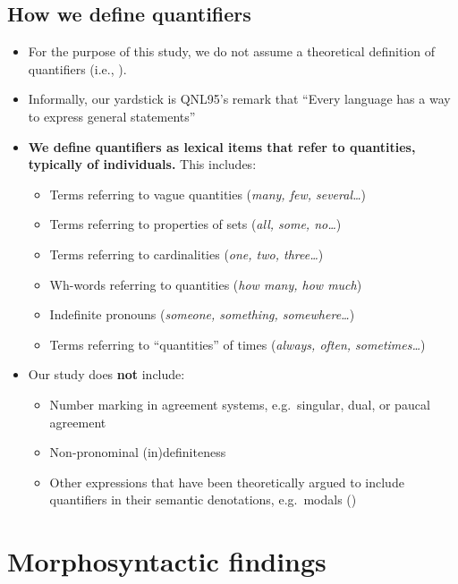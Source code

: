 \documentclass{article}
\begin{document}
\subsection{How we define quantifiers}
\begin{itemize}
\item For the purpose of this study, we do not assume a theoretical definition of quantifiers (i.e., \citealt{heimkratzer98}).
\item Informally, our yardstick is QNL95's remark that ``Every language has a way to express general statements'' %
\item \textbf{We define quantifiers as lexical items that refer to quantities, typically of individuals.}  This includes:
  
  
  \begin{itemize}
  \item Terms referring to vague quantities (\textit{many, few, several\ldots})
  \item Terms referring to properties of sets (\textit{all, some, no\ldots})
  \item Terms referring to cardinalities (\textit{one, two, three\ldots})
  \item Wh-words referring to quantities  (\textit{how many, how much})
  \item Indefinite pronouns (\textit{someone, something, somewhere\ldots})
  \item Terms referring to ``quantities'' of times (\textit{always, often, sometimes\ldots})
  \end{itemize}
\item Our study does \textbf{not} include:
  \begin{itemize}
  \item Number marking in agreement systems, e.g.\ singular, dual, or paucal agreement
  \item Non-pronominal (in)definiteness
  \item Other expressions that have been theoretically argued to include quantifiers in their semantic denotations, e.g.\ modals (\citealt{heimkratzer98})
  \end{itemize}
\end{itemize}

\section{Morphosyntactic findings}
\label{sec:mpsfind}
\end{document}
